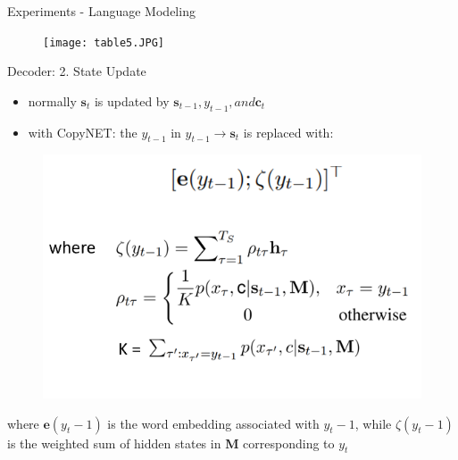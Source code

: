 \documentclass{beamer}
\begin{document}
\begin{frame}{Experiments - Language Modeling}
\begin{figure}
    \centering
    \texttt{[image: table5.JPG]}
\end{figure}
\end{frame}

\begin{frame}{Decoder: 2. State Update}
\begin{itemize}
    \item normally $\textbf{s}_t$ is updated by {$\textbf{s}_{t-1}, y_{t-1}, and \textbf{c}_t$}
    \item with CopyNET: the $y_{t-1}$ in $y_{t-1} \rightarrow \textbf{s}_{t}$ is replaced with: 
\end{itemize}
    \begin{figure}
    \centering
    \includegraphics[scale = 0.7]{state_update_full.PNG}
\end{figure}
where $\textbf{e}(y_t−1)$ is the word embedding associated with $y_t−1$, while $\zeta(y_t−1)$ is the weighted sum of hidden states in \textbf{M} corresponding to $y_t$
\end{frame}
\end{document}
